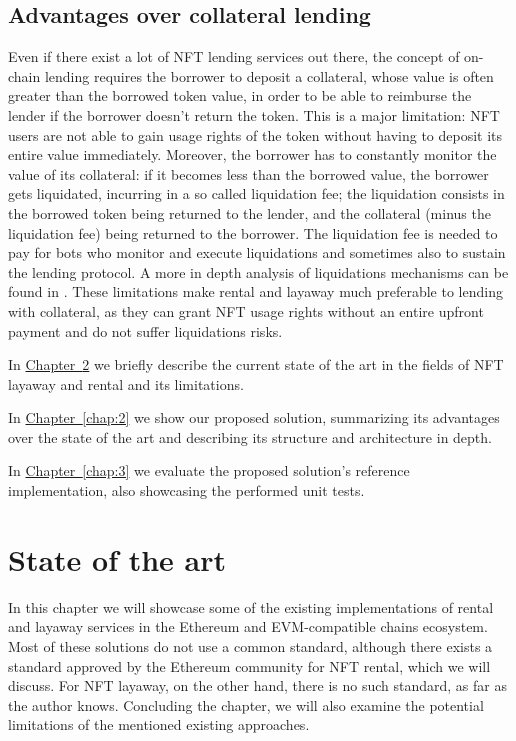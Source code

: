 \documentclass[english, LaM, oneside]{sapthesis}%
\begin{document}
\section{Advantages over collateral lending}
Even if there exist a lot of NFT lending services out there, the concept of on-chain lending requires the borrower to deposit a collateral, whose value is often greater than the borrowed token value, in order to be able to reimburse the lender if the borrower doesn't return the token. This is a major limitation: NFT users are not able to gain usage rights of the token without having to deposit its entire value immediately. Moreover, the borrower has to constantly monitor the value of its collateral: if it becomes less than the borrowed value, the borrower gets liquidated, incurring in a so called liquidation fee; the liquidation consists in the borrowed token being returned to the lender, and the collateral (minus the liquidation fee) being returned to the borrower. The liquidation fee is needed to pay for bots who monitor and execute liquidations and sometimes also to sustain the lending protocol. A more in depth analysis of liquidations mechanisms can be found in \cite{ref:liquidation}.\newline
These limitations make rental and layaway much preferable to lending with collateral, as they can grant NFT usage rights without an entire upfront payment and do not suffer liquidations risks. 

\bigskip
\bigskip
\bigskip
\bigskip
In \hyperref[chap:1]{Chapter~\ref*{chap:1}} we briefly describe the current state of the art in the fields of NFT layaway and rental and its limitations.

\bigskip
In \hyperref[chap:2]{Chapter~\ref*{chap:2}} we show our proposed solution, summarizing its advantages over the state of the art and describing its structure and architecture in depth.

\bigskip
In \hyperref[chap:3]{Chapter~\ref*{chap:3}} we evaluate the proposed solution's reference implementation, also showcasing the performed unit tests.

\chapter{State of the art}
\label{chap:1}
In this chapter we will showcase some of the existing implementations of rental and layaway services in the Ethereum and EVM-compatible chains ecosystem. Most of these solutions do not use a common standard, although there exists a standard approved by the Ethereum community for NFT rental, which we will discuss. For NFT layaway, on the other hand, there is no such standard, as far as the author knows.\newline
Concluding the chapter, we will also examine the potential limitations of the mentioned existing approaches.
\end{document}
